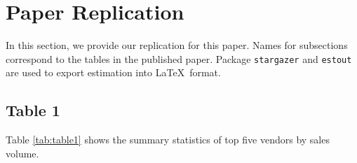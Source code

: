 \documentclass{article}
\begin{document}


\pagebreak

\section{Paper Replication}
In this section, we provide our replication for this paper. Names for subsections correspond to the tables in the published paper. Package \texttt{stargazer} \cite{hlavac2015stargazer} and \texttt{estout} \cite{jann2004estout} are used to export estimation into \LaTeX \ format.
\subsection{Table 1}
Table \ref{tab:table1} shows the summary statistics of top five vendors by sales volume.
\end{document}
